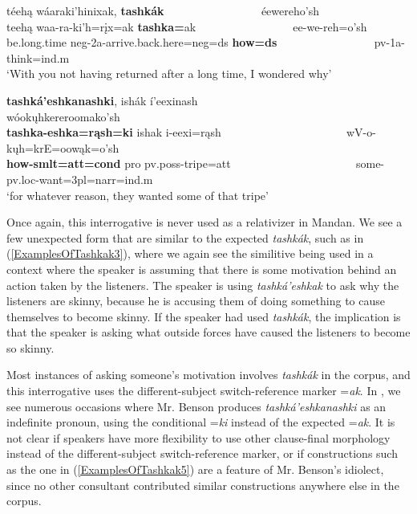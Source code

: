 \begin{exe}
\begin{xlist}
    \item\label{ExamplesOfTashkak4} \glll téehą wáaraki'hinixak, \textbf{tashkák} ~ ~ ~ ~ ~ ~ ~ ~ ~ ~ éewereho'sh\\
    teehą waa-ra-ki'h=rįx=ak \textbf{tashka=}ak ~ ~ ~ ~ ~ ~ ~ ~ ~ ~ ee-we-reh=o'sh\\
    \textnormal{be.long.time} neg-2a-\textnormal{arrive.back.here}=neg=ds \textbf{\textnormal{\bfseries how}=ds} ~ ~ ~ ~ ~ ~ ~ ~ ~ ~ pv-1a-\textnormal{think}=ind.m\\
    \glt `With you not having returned after a long time, I wondered why' \citep[318]{hollow1973a}
    
    \item\label{ExamplesOfTashkak5} \glll \textbf{tashká'eshkanashki}, ishák í'eexinash ~ ~ ~ ~ ~ ~ ~ ~ ~ ~ ~ ~ ~  wóokųhkereroomako'sh\\
    \textbf{tashka-eshka=rąsh=ki} ishak i-eexi=rąsh ~ ~ ~ ~ ~ ~ ~ ~ ~ ~ ~ ~ ~  wV-o-kųh=krE=oowąk=o'sh\\
    \textbf{\textnormal{\bfseries how}-smlt=att=cond} pro pv.poss-\textnormal{tripe}=att ~ ~ ~ ~ ~ ~ ~ ~ ~ ~ ~ ~ ~  \textnormal{some}-pv.loc-\textnormal{want}=3pl=narr=ind.m\\
    \glt `for whatever reason, they wanted some of that tripe' \citep[267]{trechter2012}
    
    
    \end{xlist}

\end{exe}

Once again, this interrogative is never used as a relativizer in Mandan. We see a few unexpected form that are similar to the expected \textit{tashkák}, such as in (\ref{ExamplesOfTashkak3}), where we again see the similitive being used in a context where the speaker is assuming that there is some motivation behind an action taken by the listeners. The speaker is using \textit{tashká'eshkak} to ask why the listeners are skinny, because he is accusing them of doing something to cause themselves to become skinny. If the speaker had used \textit{tashkák}, the implication is that the speaker is asking what outside forces have caused the listeners to become so skinny.

Most instances of asking someone's motivation involves \textit{tashkák} in the corpus, and this interrogative uses the different-subject switch-reference marker =\textit{ak}. In \citet{trechter2012}, we see numerous occasions where Mr. Benson produces \textit{tashká'eshkanashki} as an indefinite pronoun, using the conditional =\textit{ki} instead of the expected =\textit{ak}. It is not clear if speakers have more flexibility to use other clause-final morphology instead of the different-subject switch-reference marker, or if constructions such as the one in (\ref{ExamplesOfTashkak5}) are a feature of Mr. Benson's idiolect, since no other consultant contributed similar constructions anywhere else in the corpus.

